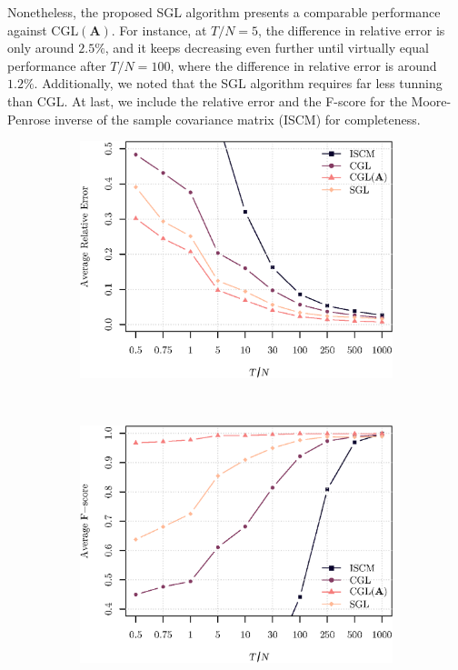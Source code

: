 Nonetheless, the proposed \textsf{SGL} algorithm presents a comparable performance against \textsf{CGL}$(\mathbf{A})$.
For instance, at $T/N = 5$, the difference in relative error is only around $2.5\%$, and it keeps decreasing
even further until virtually equal performance after $T / N = 100$, where the difference in relative error is around $1.2 \%$.
Additionally, we noted that the \textsf{SGL} algorithm requires far less tunning than \textsf{CGL}.
At last, we include the relative error and the F-score for the Moore-Penrose inverse of the sample covariance matrix
(\textsf{ISCM}) for completeness.

\begin{figure}[!htb]
    \centering
    \begin{subfigure}[b]{0.47\textwidth}
      \includegraphics[width=\textwidth]{grid/latex/figures/relative_error_grid.eps}
    \end{subfigure}
    ~ %
    \begin{subfigure}[b]{0.47\textwidth}
        \includegraphics[width=\textwidth]{grid/latex/figures/fscore_grid.eps}

\end{subfigure}
\end{figure}
